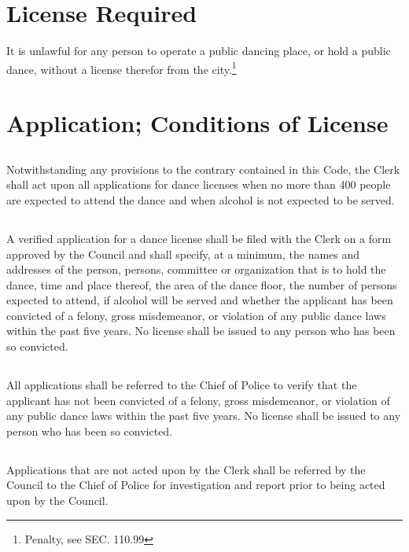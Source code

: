 \section{License Required}
It is unlawful for any person to operate a public dancing place, or hold a public dance, without a license therefor from the city.\footnote{Penalty, see SEC. 110.99}

\section{Application; Conditions of License}
\subsection{}
Notwithstanding any provisions to the contrary contained in this Code, the Clerk shall act upon all applications for dance licenses when no more than 400 people are expected to attend the dance and when alcohol is not expected to be served.
\subsection{}
A verified application for a dance license shall be filed with the Clerk on a form approved by the Council and shall specify, at a minimum, the names and addresses of the person, persons, committee or organization that is to hold the dance, time and place thereof, the area of the dance floor, the number of persons expected to attend, if alcohol will be served and whether the applicant has been convicted of a felony, gross misdemeanor, or violation of any public dance laws within the past five years.  No license shall be issued to any person who has been so convicted.
\subsection{}
All applications shall be referred to the Chief of Police to verify that the applicant has not been convicted of a felony, gross misdemeanor, or violation of any public dance laws within the past five years.  No license shall be issued to any person who has been so convicted.
\subsection{}
Applications that are not acted upon by the Clerk shall be referred by the Council to the Chief of Police for investigation and report prior to being acted upon by the Council.
